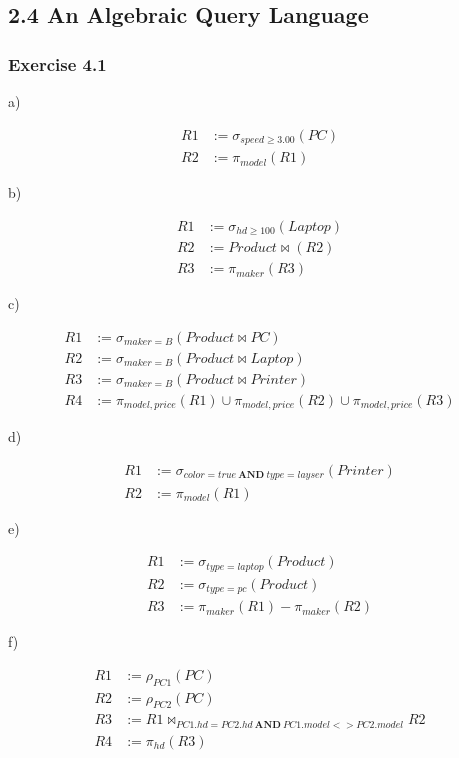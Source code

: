 \documentclass[../../main.tex]{subfiles}
\begin{document}
\subsection{2.4 An Algebraic Query Language}

\subsubsection*{Exercise 4.1}

a)

\begin{align*}
  R1 &:= \sigma_{speed \geq 3.00}(PC) \\
  R2 &:= \pi_{model}(R1)
\end{align*}

b)

\begin{align*}
  R1 &:= \sigma_{hd \geq 100}(Laptop) \\
  R2 &:= Product \bowtie (R2) \\
  R3 &:= \pi_{maker}(R3)
\end{align*}

c)

\begin{align*}
  R1 &:= \sigma_{maker=B}(Product \bowtie PC) \\
  R2 &:= \sigma_{maker=B}(Product \bowtie Laptop) \\
  R3 &:= \sigma_{maker=B}(Product \bowtie Printer) \\
  R4 &:= \pi_{model, price}(R1) \cup \pi_{model, price}(R2)
         \cup \pi_{model, price}(R3)
\end{align*}

d)

\begin{align*}
  R1 &:= \sigma_{color=true \ \mathbf{AND} \ type=layser}(Printer) \\
  R2 &:= \pi_{model}(R1)
\end{align*}

e)

\begin{align*}
  R1 &:= \sigma_{type=laptop}(Product) \\
  R2 &:= \sigma_{type=pc}(Product) \\
  R3 &:= \pi_{maker}(R1) - \pi_{maker}(R2)
\end{align*}

f)

\begin{align*}
  R1 &:= \rho_{PC1}(PC) \\
  R2 &:= \rho_{PC2}(PC) \\
  R3 &:= R1 \bowtie_{PC1.hd = PC2.hd \ \mathbf{AND} \ PC1.model <> PC2.model} R2 \\
  R4 &:= \pi_{hd}(R3)
\end{align*}
\end{document}
